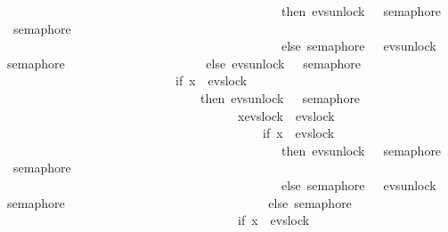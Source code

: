 \begin{isabellebody}
\ \ \ \ \ \ \ \ \ \ \ \ \ \ \ \ \ \ \ \ \ \ \ \ \ \ \ \ \ \ \ \ \ \ \ \ \ \ \ \ \ \ \ \ then\ evs{\isachardot}{\kern0pt}unlock\ {}\ {\isasymrightarrow}\ semaphore\ {}\ {\isacharbar}{\kern0pt}{\isacharbar}{\kern0pt}{\isacharbar}{\kern0pt}\ semaphore\ {}\isanewline
\ \ \ \ \ \ \ \ \ \ \ \ \ \ \ \ \ \ \ \ \ \ \ \ \ \ \ \ \ \ \ \ \ \ \ \ \ \ \ \ \ \ \ \ else\ semaphore\ {}\ {\isacharbar}{\kern0pt}{\isacharbar}{\kern0pt}{\isacharbar}{\kern0pt}\ evs{\isachardot}{\kern0pt}unlock\ {}\ {\isasymrightarrow}\ semaphore\ {}{\isacharparenright}{\kern0pt}{\isacharparenright}{\kern0pt}\isanewline
\ \ \ \ \ \ \ \ \ \ \ \ \ \ \ \ \ \ \ \ \ else\ evs{\isachardot}{\kern0pt}unlock\ {}\ {\isasymrightarrow}\ semaphore\ {}\isanewline
\ \ \ \ \ \ \ \ \ \ \ \ \ \ \ \ \ \ \ \ \ \ \ \ \ \ {\isacharbar}{\kern0pt}{\isacharbar}{\kern0pt}{\isacharbar}{\kern0pt}\ {\isacharparenleft}{\kern0pt}if\ x\ {\isacharequal}{\kern0pt}\ evs{\isachardot}{\kern0pt}lock\ {}\isanewline
\ \ \ \ \ \ \ \ \ \ \ \ \ \ \ \ \ \ \ \ \ \ \ \ \ \ \ \ \ \ \ then\ evs{\isachardot}{\kern0pt}unlock\ {}\ {\isasymrightarrow}\ semaphore\ {}\isanewline
\ \ \ \ \ \ \ \ \ \ \ \ \ \ \ \ \ \ \ \ \ \ \ \ \ \ \ \ \ \ \ \ \ \ \ \ {\isacharbar}{\kern0pt}{\isacharbar}{\kern0pt}{\isacharbar}{\kern0pt}\ {\isasymbox}x{\isasymin}{\isacharbraceleft}{\kern0pt}evs{\isachardot}{\kern0pt}lock\ {}{\isacharcomma}{\kern0pt}\ evs{\isachardot}{\kern0pt}lock\ {}{\isacharbraceright}{\kern0pt}\isanewline
\ \ \ \ \ \ \ \ \ \ \ \ \ \ \ \ \ \ \ \ \ \ \ \ \ \ \ \ \ \ \ \ \ \ \ \ \ \ \ \ {\isasymrightarrow}\ {\isacharparenleft}{\kern0pt}if\ x\ {\isacharequal}{\kern0pt}\ evs{\isachardot}{\kern0pt}lock\ {}\ \isanewline
\ \ \ \ \ \ \ \ \ \ \ \ \ \ \ \ \ \ \ \ \ \ \ \ \ \ \ \ \ \ \ \ \ \ \ \ \ \ \ \ \ \ \ \ then\ evs{\isachardot}{\kern0pt}unlock\ {}\ {\isasymrightarrow}\ semaphore\ {}\ {\isacharbar}{\kern0pt}{\isacharbar}{\kern0pt}{\isacharbar}{\kern0pt}\ semaphore\ {}\isanewline
\ \ \ \ \ \ \ \ \ \ \ \ \ \ \ \ \ \ \ \ \ \ \ \ \ \ \ \ \ \ \ \ \ \ \ \ \ \ \ \ \ \ \ \ else\ semaphore\ {}\ {\isacharbar}{\kern0pt}{\isacharbar}{\kern0pt}{\isacharbar}{\kern0pt}\ evs{\isachardot}{\kern0pt}unlock\ {}\ {\isasymrightarrow}\ semaphore\ {}{\isacharparenright}{\kern0pt}\isanewline
\ \ \ \ \ \ \ \ \ \ \ \ \ \ \ \ \ \ \ \ \ \ \ \ \ \ \ \ \ \ \ else\ semaphore\ {}\ \isanewline
\ \ \ \ \ \ \ \ \ \ \ \ \ \ \ \ \ \ \ \ \ \ \ \ \ \ \ \ \ \ \ \ \ \ \ \ {\isacharbar}{\kern0pt}{\isacharbar}{\kern0pt}{\isacharbar}{\kern0pt}\ {\isacharparenleft}{\kern0pt}if\ x\ {\isacharequal}{\kern0pt}\ evs{\isachardot}{\kern0pt}lock\ {}\isanewline

\end{isabellebody}
